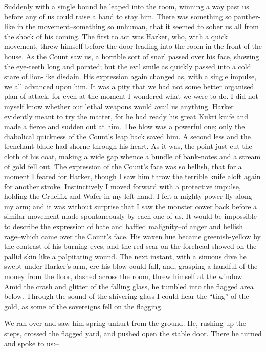 \documentclass[12pt,openright]{book}
\begin{document}
Suddenly with a single bound he leaped into the room, winning a way past us before any of us could raise a hand to stay him. There was something so panther-like in the movement–something so unhuman, that it seemed to sober us all from the shock of his coming. The first to act was Harker, who, with a quick movement, threw himself before the door leading into the room in the front of the house. As the Count saw us, a horrible sort of snarl passed over his face, showing the eye-teeth long and pointed; but the evil smile as quickly passed into a cold stare of lion-like disdain. His expression again changed as, with a single impulse, we all advanced upon him. It was a pity that we had not some better organised plan of attack, for even at the moment I wondered what we were to do. I did not myself know whether our lethal weapons would avail us anything. Harker evidently meant to try the matter, for he had ready his great Kukri knife and made a fierce and sudden cut at him. The blow was a powerful one; only the diabolical quickness of the Count’s leap back saved him. A second less and the trenchant blade had shorne through his heart. As it was, the point just cut the cloth of his coat, making a wide gap whence a bundle of bank-notes and a stream of gold fell out. The expression of the Count’s face was so hellish, that for a moment I feared for Harker, though I saw him throw the terrible knife aloft again for another stroke. Instinctively I moved forward with a protective impulse, holding the Crucifix and Wafer in my left hand. I felt a mighty power fly along my arm; and it was without surprise that I saw the monster cower back before a similar movement made spontaneously by each one of us. It would be impossible to describe the expression of hate and baffled malignity–of anger and hellish rage–which came over the Count’s face. His waxen hue became greenish-yellow by the contrast of his burning eyes, and the red scar on the forehead showed on the pallid skin like a palpitating wound. The next instant, with a sinuous dive he swept under Harker’s arm, ere his blow could fall, and, grasping a handful of the money from the floor, dashed across the room, threw himself at the window. Amid the crash and glitter of the falling glass, he tumbled into the flagged area below. Through the sound of the shivering glass I could hear the “ting” of the gold, as some of the sovereigns fell on the flagging.

We ran over and saw him spring unhurt from the ground. He, rushing up the steps, crossed the flagged yard, and pushed open the stable door. There he turned and spoke to us:–
\end{document}
